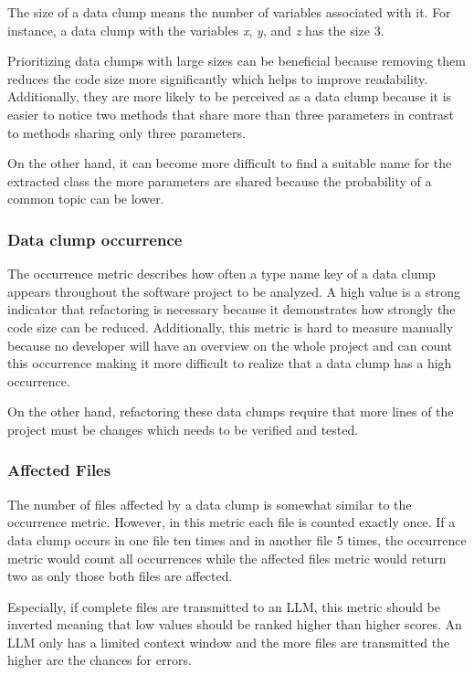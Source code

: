 The size of a data clump means the number of variables associated with it. For instance, a data clump with the variables \textit{x}, \textit{y}, and \textit{z} has the size 3. 

Prioritizing data clumps with large sizes can be beneficial because removing them reduces the code size more significantly which helps to improve readability. Additionally, they are more likely to be perceived as a data clump because it is easier to notice two methods that share more than three parameters in contrast to methods sharing only three parameters. 

On the other hand,  it can become more difficult to find a suitable name for the extracted class the more parameters are shared because the probability of a common topic can be lower. 

\subsubsection{ Data clump occurrence}

The occurrence metric describes how often a type name key of a data clump appears throughout the software project to be analyzed. A high value is a strong indicator that refactoring is necessary because it demonstrates how strongly the code size can be reduced. Additionally, this metric is hard to measure manually because no developer will have an overview on the whole project and can count this occurrence making it more difficult to realize that a data clump has a high occurrence.  

On the other hand, refactoring these data clumps require that more lines of the project must be changes which needs to be verified and tested. 

\subsubsection{Affected Files}

The number of files affected by a data clump is somewhat  similar to the occurrence metric. However, in this metric each file is counted exactly once. If a data clump occurs in one file ten times and in another file 5 times, the occurrence metric would count all occurrences while the affected files metric would return two as only those both files are affected. 

Especially, if complete files are transmitted to an \ac{LLM}, this metric should be inverted meaning that low values should be ranked higher than higher scores. An \ac{LLM} only has a limited context window and the more files are transmitted the higher are the chances for errors.  

